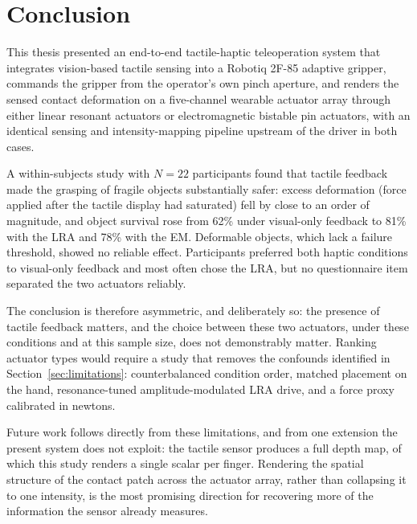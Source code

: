 \documentclass[12pt, a4paper, twoside, openright]{report}
\begin{document}
\chapter{Conclusion}
\label{ch:conclusion}

This thesis presented an end-to-end tactile-haptic teleoperation system that
integrates vision-based tactile sensing into a Robotiq 2F-85 adaptive gripper,
commands the gripper from the operator's own pinch aperture, and renders the
sensed contact deformation on a five-channel wearable actuator array through
either linear resonant actuators or electromagnetic bistable pin actuators,
with an identical sensing and intensity-mapping pipeline upstream of the driver
in both cases.

A within-subjects study with $N=22$ participants found that tactile feedback
made the grasping of fragile objects substantially safer: excess deformation
(force applied after the tactile display had saturated) fell by close to
an order of magnitude, and object survival rose from 62\% under visual-only
feedback to 81\% with the LRA and 78\% with the EM. Deformable objects, which
lack a failure threshold, showed no reliable effect. Participants preferred both
haptic conditions to visual-only feedback and most often chose the LRA, but no
questionnaire item separated the two actuators reliably.

The conclusion is therefore asymmetric, and deliberately so: the presence of
tactile feedback matters, and the choice between these two actuators, under
these conditions and at this sample size, does not demonstrably matter. Ranking
actuator types would require a study that removes the confounds identified in
Section~\ref{sec:limitations}: counterbalanced condition order, matched
placement on the hand, resonance-tuned amplitude-modulated LRA drive, and a
force proxy calibrated in newtons.

Future work follows directly from these limitations, and from one extension the
present system does not exploit: the tactile sensor produces a full depth map,
of which this study renders a single scalar per finger. Rendering the spatial
structure of the contact patch across the actuator array, rather than
collapsing it to one intensity, is the most promising direction for
recovering more of the information the sensor already measures.

\cleardoublepage
\begingroup
\raggedright
\printbibliography[heading=bibintoc, title={References}]
\endgroup
\end{document}

